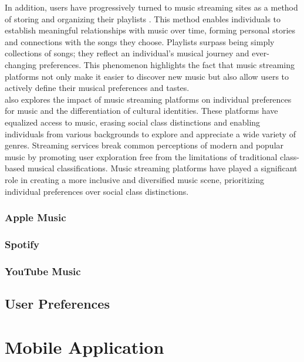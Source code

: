 In addition, users have progressively turned to music streaming sites as a method of storing and organizing their playlists \parencite{ellis20}. This method enables individuals to establish meaningful relationships with music over time, forming personal stories and connections with the songs they choose. Playlists surpass being simply collections of songs; they reflect an individual's musical journey and ever-changing preferences. This phenomenon highlights the fact that music streaming platforms not only make it easier to discover new music but also allow users to actively define their musical preferences and tastes. \\

\textcite{webster19} also explores the impact of music streaming platforms on individual preferences for music and the differentiation of cultural identities. These platforms have equalized access to music, erasing social class distinctions and enabling individuals from various backgrounds to explore and appreciate a wide variety of genres. Streaming services break common perceptions of modern and popular music by promoting user exploration free from the limitations of traditional class-based musical classifications. Music streaming platforms have played a significant role in creating a more inclusive and diversified music scene, prioritizing individual preferences over social class distinctions.

\subsubsection{Apple Music}

\subsubsection{Spotify}

\subsubsection{YouTube Music}

\subsection{User Preferences}

\section{Mobile Application}

